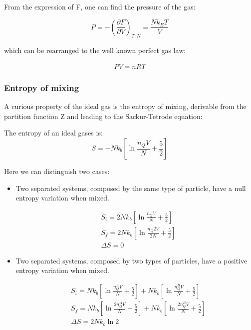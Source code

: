 \documentclass{article}
\begin{document}
From the expression of F, one can find the pressure of the gas:

\begin{equation}
    P=-\left(\frac{\partial F}{\partial V}\right)_{T,N}=\frac{Nk_BT}{V}
\end{equation}

which can be rearranged to the well known perfect gas law:

\begin{align*}
    PV=nRT
\end{align*}


\subsubsection{Entropy of mixing}

A curious property of the ideal gas is the entropy of mixing, derivable from the partition function Z and
leading to the Sackur-Tetrode equation:

\begin{tcolorbox}[colframe=gray!50, colback=gray!10, coltitle=black, title=Sackur-Tetrode Equation]
    The entropy of an ideal gases is:
    \begin{equation}
        S=-Nk_b\left[\ln{\frac{n_QV}{N}}+\frac{5}{2}\right]
    \end{equation}

\end{tcolorbox}

Here we can distinguish two cases:

\begin{itemize}
    \item Two separated systems, composed by the same type of particle, have a null entropy variation when mixed.


          \begin{align*}
               & S_i=2Nk_b\left[\ln{\frac{n_QV}{N}}+\frac{5}{2}\right]   \\
               & S_f=2Nk_b\left[\ln{\frac{n_Q2V}{2N}}+\frac{5}{2}\right] \\
               & \Delta S=0
          \end{align*}


    \item Two separated systems, composed by two types of particles, have a positive entropy variation when mixed.


          \begin{align*}
               & S_i=Nk_b\left[\ln{\frac{n_Q^AV}{N}}+\frac{5}{2}\right]+Nk_b\left[\ln{\frac{n_Q^BV}{N}}+\frac{5}{2}\right]    \\
               & S_f= Nk_b\left[\ln{\frac{2n_Q^AV}{N}}+\frac{5}{2}\right]+Nk_b\left[\ln{\frac{2n_Q^BV}{N}}+\frac{5}{2}\right] \\
               & \Delta S=2Nk_b\ln{2}
          \end{align*}

\end{itemize}
\end{document}

